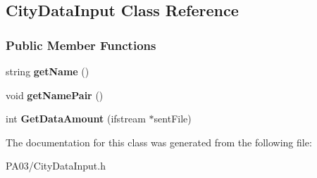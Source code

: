 \hypertarget{class_city_data_input}{}\subsection{City\+Data\+Input Class Reference}
\label{class_city_data_input}
\subsubsection*{Public Member Functions}
\begin{DoxyCompactItemize}
\item 
string {\bfseries get\+Name} ()\hypertarget{class_city_data_input_a24222ef90262740f141e6a8d0ec094bb}{}\label{class_city_data_input_a24222ef90262740f141e6a8d0ec094bb}

\item 
void {\bfseries get\+Name\+Pair} ()\hypertarget{class_city_data_input_a32e818e4268aaa439e9ebf4c81ec51f0}{}\label{class_city_data_input_a32e818e4268aaa439e9ebf4c81ec51f0}

\item 
int {\bfseries Get\+Data\+Amount} (ifstream $\ast$sent\+File)\hypertarget{class_city_data_input_ac9a348a67dfc8628af281f491d586b32}{}\label{class_city_data_input_ac9a348a67dfc8628af281f491d586b32}

\end{DoxyCompactItemize}


The documentation for this class was generated from the following file\+:\begin{DoxyCompactItemize}
\item 
P\+A03/City\+Data\+Input.\+h\end{DoxyCompactItemize}
